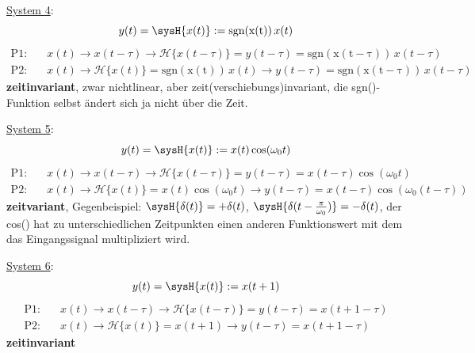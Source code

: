 \begin{Loesung}
\item  \underline{System 4}:
\begin{equation}
y(t) = \sysH{x(t)}:= \mathrm{sgn(x(t))} \, x(t)
\end{equation}
\begin{align}
\text{P1:}& \quad x(t)\rightarrow x(t-\tau)\rightarrow \mathcal{H}\{x(t-\tau)\}=y(t-\tau)=\mathrm{sgn(x(t-\tau))} \, x(t-\tau)\\
\text{P2:}& \quad x(t)\rightarrow \mathcal{H}\{x(t)\}=\mathrm{sgn(x(t))} \, x(t)\rightarrow y(t-\tau)=\mathrm{sgn(x(t-\tau))} \, x(t-\tau)
\end{align}
\textbf{zeitinvariant}, zwar nichtlinear, aber zeit(verschiebungs)invariant, die
sgn()-Funktion selbst ändert sich ja nicht über die Zeit.

\item  \underline{System 5}:
\begin{equation}
y(t) = \sysH{x(t)}:= x(t) \cos(\omega_0 t)
\end{equation}
\begin{align}
\text{P1:}& \quad x(t)\rightarrow x(t-\tau)\rightarrow \mathcal{H}\{x(t-\tau)\}=y(t-\tau)=x(t-\tau) \cos(\omega_0 t)\\
\text{P2:}& \quad x(t)\rightarrow \mathcal{H}\{x(t)\}=x(t) \cos(\omega_0 t)\rightarrow y(t-\tau)=x(t-\tau) \cos(\omega_0 (t-\tau))
\end{align}
\textbf{zeitvariant}, Gegenbeispiel: $\sysH{\delta(t)}=+\delta(t)$,
$\sysH{\delta(t-\frac{\pi}{\omega_0})}=-\delta(t)$, der cos() hat zu unterschiedlichen
Zeitpunkten einen anderen Funktionswert mit dem das Eingangssignal
multipliziert wird.

\item  \underline{System 6}:
\begin{equation}
y(t) = \sysH{x(t)}:= x(t+1)
\end{equation}
\begin{align}
\text{P1:}& \quad x(t)\rightarrow x(t-\tau)\rightarrow \mathcal{H}\{x(t-\tau)\}=y(t-\tau)=x(t+1-\tau)\\
\text{P2:}& \quad x(t)\rightarrow \mathcal{H}\{x(t)\}=x(t+1)\rightarrow y(t-\tau)=x(t+1-\tau)
\end{align}
\textbf{zeitinvariant}


\end{Loesung}
